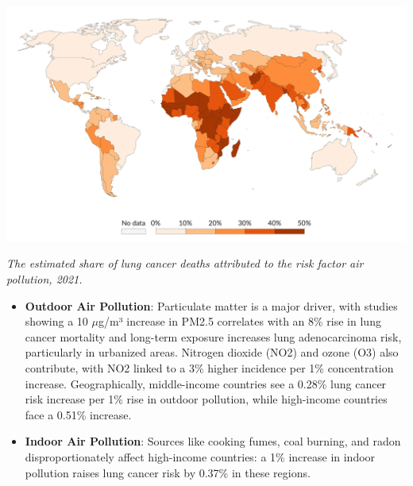\vspace{1em}
\begin{center} 
    \includegraphics[width=\textwidth]{../assets/02-etiology/share-of-lung-cancer-deaths-attributed-to-air-pollution.png}

    \small\textit{The estimated share of lung cancer deaths attributed to the risk factor air 
    pollution, 2021. \cite{ihme2016}}
\end{center}
\vspace{1em} 

\newpage

\begin{itemize}
    \item \textbf{Outdoor Air Pollution}: Particulate matter is a major driver, with studies showing 
    a 10 $\mu$g/m³ increase in PM2.5 correlates with an 8\% rise in lung cancer mortality \cite{38513187} 
    and long-term exposure increases lung adenocarcinoma risk, particularly in urbanized areas. 
    Nitrogen dioxide (NO2) and ozone (O3) also contribute, with NO2 linked to a 3\% higher incidence 
    per 1\% concentration increase. Geographically, middle-income countries see a 0.28\% lung cancer 
    risk increase per 1\% rise in outdoor pollution, while high-income countries face a 0.51\% 
    increase. \cite{jco2023}

    \item \textbf{Indoor Air Pollution}: Sources like cooking fumes, coal burning, and radon 
    disproportionately affect high-income countries: a 1\% increase in indoor pollution raises lung 
    cancer risk by 0.37\% in these regions. \cite{fpubh.2024.1372320}
\end{itemize}

